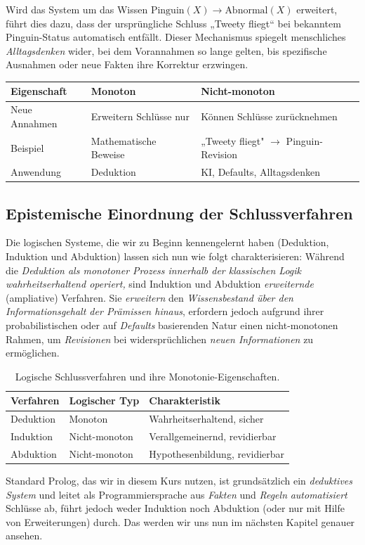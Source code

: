 \documentclass[parskip=half,a4paper,11pt]{scrreprt}
\begin{document}
Wird das System um das Wissen $\text{Pinguin}(X) \rightarrow \text{Abnormal}(X)$ erweitert, führt dies dazu, dass der ursprüngliche Schluss „Tweety fliegt“ bei bekanntem Pinguin-Status automatisch entfällt. Dieser Mechanismus spiegelt menschliches\textit{ Alltagsdenken} wider, bei dem Vorannahmen so lange gelten, bis spezifische Ausnahmen oder neue Fakten ihre Korrektur erzwingen.

\begin{center}
\begin{tabular}{lll}
\toprule
\textbf{Eigenschaft} & \textbf{Monoton} & \textbf{Nicht-monoton} \\
\midrule
Neue Annahmen & Erweitern Schlüsse nur & Können Schlüsse zurücknehmen \\
Beispiel & Mathematische Beweise & „Tweety fliegt" $\to$ Pinguin-Revision \\
Anwendung & Deduktion & KI, Defaults, Alltagsdenken \\
\bottomrule
\end{tabular}
\end{center}

\subsection{Epistemische Einordnung der Schlussverfahren}

Die logischen Systeme, die wir zu Beginn kennengelernt haben (Deduktion, Induktion und Abduktion) lassen sich nun wie folgt charakterisieren: Während die \textit{Deduktion als monotoner Prozess innerhalb der klassischen Logik wahrheitserhaltend operiert,} sind Induktion und Abduktion \textit{erweiternde} (ampliative) Verfahren. Sie \textit{erweitern} den \textit{Wissensbestand über den Informationsgehalt der Prämissen hinaus}, erfordern jedoch aufgrund ihrer probabilistischen oder auf \textit{Defaults} basierenden Natur einen nicht-monotonen Rahmen, um \textit{Revisionen} bei widersprüchlichen \textit{neuen Informationen} zu ermöglichen.
\begin{table}[h]
\centering
\begin{tabular}{lll}
\toprule
\textbf{Verfahren} & \textbf{Logischer Typ} & \textbf{Charakteristik} \\
\midrule
Deduktion & Monoton & Wahrheitserhaltend, sicher \\
Induktion & Nicht-monoton & Verallgemeinernd, revidierbar \\
Abduktion & Nicht-monoton & Hypothesenbildung, revidierbar \\
\bottomrule
\end{tabular}
\caption{Logische Schlussverfahren und ihre Monotonie-Eigenschaften.}
\end{table}
Standard Prolog, das wir in diesem Kurs nutzen,  ist grundsätzlich ein \textit{deduktives System} und leitet als Programmiersprache aus \textit{Fakten} und \textit{Regeln} \textit{automatisiert }Schlüsse ab, führt jedoch weder Induktion noch Abduktion (oder nur mit Hilfe von  Erweiterungen) durch. Das werden wir uns nun im nächsten Kapitel  genauer ansehen.
\end{document}
